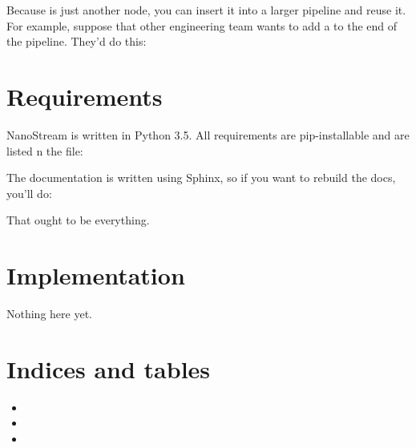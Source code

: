 \documentclass[letterpaper,10pt,english]{sphinxmanual}
\begin{document}
Because  is just another node, you can insert it into a
larger pipeline and reuse it. For example, suppose that other
engineering team wants to add a  to the end of the
pipeline. They’d do this:

%
\begin{sphinxVerbatim}[commandchars=\\\{\}]
  
  
\end{sphinxVerbatim}


\chapter{Requirements}
\label{\detokenize{requirements:requirements}}\label{\detokenize{requirements::doc}}
NanoStream is written in Python 3.5. All requirements are pip-installable and
are listed n the  file:


The documentation is written using Sphinx, so if you want to rebuild the docs,
you’ll do:


That ought to be everything.


\chapter{Implementation}
\label{\detokenize{implementation:implementation}}\label{\detokenize{implementation::doc}}
Nothing here yet.


\chapter{Indices and tables}
\label{\detokenize{index:indices-and-tables}}\begin{itemize}
\item {} 

\item {} 

\item {} 

\end{itemize}



\renewcommand{\indexname}{Index}
\printindex
\end{document}

